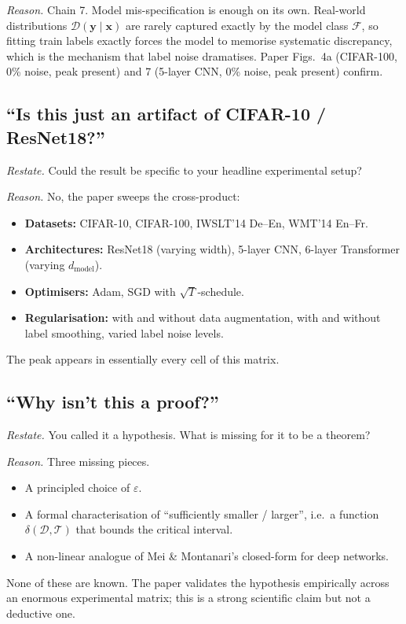 \documentclass[11pt,a4paper]{article}
\newcommand{\T}{\mathcal{T}}
\newcommand{\D}{\mathcal{D}}
\newcommand{\F}{\mathcal{F}}
\theoremstyle{definition}
\begin{document}
\textit{Reason.} Chain 7. Model mis-specification is enough on its own. Real-world distributions $\D(\bm{y}\mid\bm{x})$ are rarely captured exactly by the model class $\F$, so fitting train labels exactly forces the model to memorise systematic discrepancy, which is the mechanism that label noise dramatises. Paper Figs.\ 4a (CIFAR-100, 0\% noise, peak present) and 7 (5-layer CNN, 0\% noise, peak present) confirm.

\subsection{``Is this just an artifact of CIFAR-10 / ResNet18?''}

\textit{Restate.} Could the result be specific to your headline experimental setup?

\textit{Reason.} No, the paper sweeps the cross-product:
\begin{itemize}[leftmargin=1.2em]
\item \textbf{Datasets:} CIFAR-10, CIFAR-100, IWSLT'14 De--En, WMT'14 En--Fr.
\item \textbf{Architectures:} ResNet18 (varying width), 5-layer CNN, 6-layer Transformer (varying $d_{\text{model}}$).
\item \textbf{Optimisers:} Adam, SGD with $\sqrt{T}$-schedule.
\item \textbf{Regularisation:} with and without data augmentation, with and without label smoothing, varied label noise levels.
\end{itemize}
The peak appears in essentially every cell of this matrix.

\subsection{``Why isn't this a proof?''}

\textit{Restate.} You called it a hypothesis. What is missing for it to be a theorem?

\textit{Reason.} Three missing pieces.
\begin{itemize}[leftmargin=1.2em]
\item A principled choice of $\varepsilon$.
\item A formal characterisation of ``sufficiently smaller / larger'', i.e.\ a function $\delta(\D,\T)$ that bounds the critical interval.
\item A non-linear analogue of Mei \& Montanari's closed-form for deep networks.
\end{itemize}
None of these are known. The paper validates the hypothesis empirically across an enormous experimental matrix; this is a strong scientific claim but not a deductive one.
\end{document}
